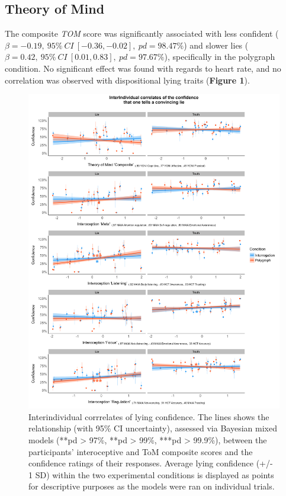 \documentclass[
  man,mask,floatsintext]{apa6}
\begin{document}
\hypertarget{theory-of-mind-1}{%
\subsection{Theory of Mind}\label{theory-of-mind-1}}

The composite \emph{TOM} score was significantly associated with less confident (\(\beta=-0.19,~95\%~CI~[-0.36, -0.02],~pd = 98.47\%\)) and slower lies (\(\beta=0.42,~95\%~CI~[0.01, 0.83],~pd = 97.67\%\)), specifically in the polygraph condition. No significant effect was found with regards to heart rate, and no correlation was observed with dispositional lying traits (\textbf{Figure 1}).

\begin{figure}
\includegraphics[width=1\linewidth]{../figures/figure1} \caption{Interindividual corrrelates of lying confidence. The lines shows the relationship (with 95\% CI uncertainty), assessed via Bayesian mixed models (\***pd > 97\%, \***pd > 99\%, \****pd > 99.9\%), between the participants' interoceptive and ToM composite scores and the confidence ratings of their responses. Average lying confidence (+/- 1 SD) within the two experimental conditions is displayed as points for descriptive purposes as the models were ran on individual trials.}\label{fig:unnamed-chunk-1}
\end{figure}
\end{document}
